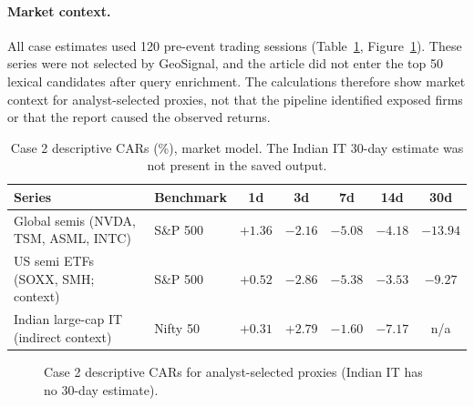 \documentclass[10pt,a4paper,twocolumn]{article}
\begin{document}
\paragraph{Market context.} All case estimates used 120 pre-event trading sessions (Table~\ref{tab:semi-car}, Figure~\ref{fig:semi-car}). These series were not selected by GeoSignal, and the article did not enter the top 50 lexical candidates after query enrichment. The calculations therefore show market context for analyst-selected proxies, not that the pipeline identified exposed firms or that the report caused the observed returns.

\begin{table}[t]
\centering
\caption{Case 2 descriptive CARs (\%), market model. The Indian IT 30-day estimate was not present in the saved output.}
\label{tab:semi-car}
\small
\begin{tabular}{llccccc}
\toprule
\textbf{Series} & \textbf{Benchmark} & \textbf{1d} & \textbf{3d} & \textbf{7d} & \textbf{14d} & \textbf{30d} \\
\midrule
Global semis (NVDA, TSM, ASML, INTC) & S\&P 500 & $+1.36$ & $-2.16$ & $-5.08$ & $-4.18$ & $-13.94$ \\
US semi ETFs (SOXX, SMH; context) & S\&P 500 & $+0.52$ & $-2.86$ & $-5.38$ & $-3.53$ & $-9.27$ \\
Indian large-cap IT (indirect context) & Nifty 50 & $+0.31$ & $+2.79$ & $-1.60$ & $-7.17$ & n/a \\
\bottomrule
\end{tabular}
\end{table}

\begin{figure}[htbp]
\centering
{}
\caption{Case 2 descriptive CARs for analyst-selected proxies (Indian IT has no 30-day estimate).}
\label{fig:semi-car}
\end{figure}
\end{document}
